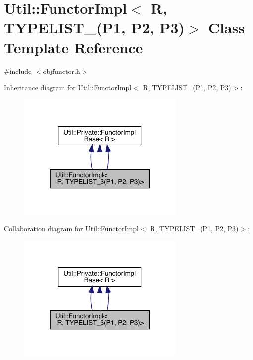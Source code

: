 \hypertarget{classUtil_1_1FunctorImpl_3_01R_00_01TYPELIST__3_07P1_00_01P2_00_01P3_08_4}{}\section{Util\+:\+:Functor\+Impl$<$ R, T\+Y\+P\+E\+L\+I\+S\+T\+\_(P1, P2, P3)$>$ Class Template Reference}
\label{classUtil_1_1FunctorImpl_3_01R_00_01TYPELIST__3_07P1_00_01P2_00_01P3_08_4}


{\ttfamily \#include $<$objfunctor.\+h$>$}



Inheritance diagram for Util\+:\+:Functor\+Impl$<$ R, T\+Y\+P\+E\+L\+I\+S\+T\+\_(P1, P2, P3)$>$\+:
\nopagebreak
\begin{figure}[H]
\begin{center}
\leavevmode
\includegraphics[width=230pt]{d0/d65/classUtil_1_1FunctorImpl_3_01R_00_01TYPELIST__3_07P1_00_01P2_00_01P3_08_4__inherit__graph}
\end{center}
\end{figure}


Collaboration diagram for Util\+:\+:Functor\+Impl$<$ R, T\+Y\+P\+E\+L\+I\+S\+T\+\_(P1, P2, P3)$>$\+:
\nopagebreak
\begin{figure}[H]
\begin{center}
\leavevmode
\includegraphics[width=230pt]{dd/db3/classUtil_1_1FunctorImpl_3_01R_00_01TYPELIST__3_07P1_00_01P2_00_01P3_08_4__coll__graph}
\end{center}
\end{figure}
